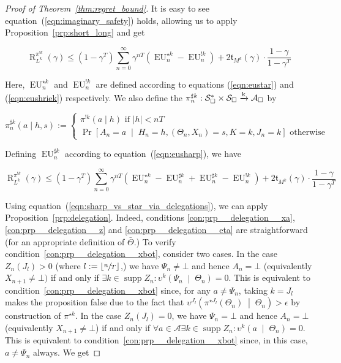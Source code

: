 \documentclass[anon,12pt]{colt2018} %
\newcommand{\Comment}[1]{}
\DeclareMathOperator{\Supp}{supp}
\newcommand{\AP}[1]{\left(#1\right)}
\newcommand{\APM}[2]{\left(#1\;\middle\vert\;#2\right)}
\newcommand{\ABM}[2]{\left[#1\;\middle\vert\;#2\right]}
\newcommand{\CP}[3]{\underset{#1}{\operatorname{Pr}}\ABM{#2}{#3}}
\newcommand{\Reals}{\mathbb{R}}
\newcommand{\Abs}[1]{\left\vert #1 \right\vert}
\newcommand{\Floor}[1]{\left\lfloor #1 \right\rfloor}
\newcommand{\K}{\xrightarrow{\textnormal{k}}}
\newcommand{\A}{\mathcal{A}}
\newcommand{\St}{\mathcal{S}}
\newcommand{\EU}{\operatorname{EU}}
\newcommand{\Rg}{\operatorname{R}}
\newcommand{\Tn}{\mathfrak{t}}
\newcommand{\Ad}{\upsilon}
\newcommand{\PoS}{:\St_\square^* \times \St_\square \K \A_\square}
\newcommand{\IP}{\pi^{!k}}
\begin{document}
\begin{proof}[Proof of Theorem~\ref{thm:regret_bound}]
\Comment{...we define $\alpha_{\Ad\pi}: \St_\square^* \K \St^*$ by

$$\alpha_{\sigma\pi} (g \mid h) := [[h = \underline{g}]]C_h\prod_{n = 0}^{\Abs{h}-1} \sum_{a \in \A}\left([[g_n \in \bot a?]] \pi\left(\bot \mid g_{:n}\right)\sigma\left(a \mid h_{:n}\right)+[[g_n \in a\bot?]]\pi\left(a \mid g_{:n}\right)\right)$$

Here, $C_h \in \Reals$ is a constant defined s.t. the probabilities sum to 1. We define the $?$-policy $\left[\sigma\right]\underline{\pi}$ by

$$\left[\sigma\right]\underline{\pi}(a \mid h):=\Pr_{g \sim \alpha_{\sigma\pi}(h)}\left[\pi\left(g\right)=a \lor \left(\pi\left(g\right)=\bot \land \sigma(h)=a\right)\right]$$}

It is easy to see equation~(\ref{eqn:imaginary_safety}) holds, allowing us to apply Proposition~\ref{prp:short_long} and get

\[\Rg_{L^k}^{\IP}(\gamma) \leq \AP{1-\gamma^T}\sum_{n=0}^\infty \gamma^{nT}\AP{\EU^{\star k}_n-\EU^{!k}_n}+2\Tn_{M^k}(\gamma)\cdot\frac{1-\gamma}{1-\gamma^T}\]

Here, $\EU^{\star k}_n$ and $\EU^{!k}_n$ are defined according to equations (\ref{eqn:eustar}) and (\ref{eqn:eushriek}) respectively. We also define the $\pi^{\sharp k}_n\PoS$ by

$$\pi^{\sharp k}_n(a \mid h,s):=\begin{cases} \pi^{!k}(a \mid h) \text{ if } \Abs{h} < nT \\ \CP{}{A_n=a}{H_n=h,\AP{\Theta_n,X_n}=s,K=k,J_n=k} \text{ otherwise} \end{cases}$$

Defining $\EU^{\sharp k}_n$ according to equation~(\ref{eqn:eusharp}), we have

\[\Rg_{L^k}^{\IP}(\gamma) \leq \AP{1-\gamma^T}\sum_{n=0}^\infty \gamma^{nT}\AP{\EU^{\star k}_n-\EU^{\sharp k}_n+\EU^{\sharp k}_n-\EU^{!k}_n}+2\Tn_{M^k}(\gamma)\cdot\frac{1-\gamma}{1-\gamma^T}\]

Using equation~(\ref{eqn:sharp_vs_star_via_delegations}), we can apply Proposition~\ref{prp:delegation}. Indeed, conditions \ref{con:prp__delegation__xa}, \ref{con:prp__delegation__z} and \ref{con:prp__delegation__eta} are straightforward (for an appropriate definition of $\bar{\Theta}$.) To verify condition~\ref{con:prp__delegation__xbot}, consider two cases. In the case $Z_n\AP{J_l} > 0$ (where $l:=\Floor{\sfrac{n}{T}}$,) we have $\Psi_n\ne\bot$ and hence $A_n=\bot$ (equivalently $X_{n+1}\ne\bot)$ if and only if $\exists k \in \Supp{Z_n}: \Ad^k\APM{\Psi_n}{\Theta_n}=0$. This is equivalent to condition~\ref{con:prp__delegation__xbot} since, for any $a\ne\Psi_n$, taking $k=J_l$ makes the proposition false due to the fact that $\Ad^{J_l}\APM{\pi^{\star J_l}\AP{\Theta_n}}{\Theta_n} > \epsilon$ by construction of $\pi^{\star k}$. In the case $Z_n\AP{J_l} = 0$, we have $\Psi_n=\bot$ and hence $A_n=\bot$ (equivalently $X_{n+1}\ne\bot$) if and only if $\forall a\in\A\exists k \in \Supp{Z_n}:\Ad^k\APM{a}{\Theta_n}=0$. This is equivalent to condition~\ref{con:prp__delegation__xbot} since, in this case, $a\ne\Psi_n$ always. We get


\end{proof}
\end{document}
